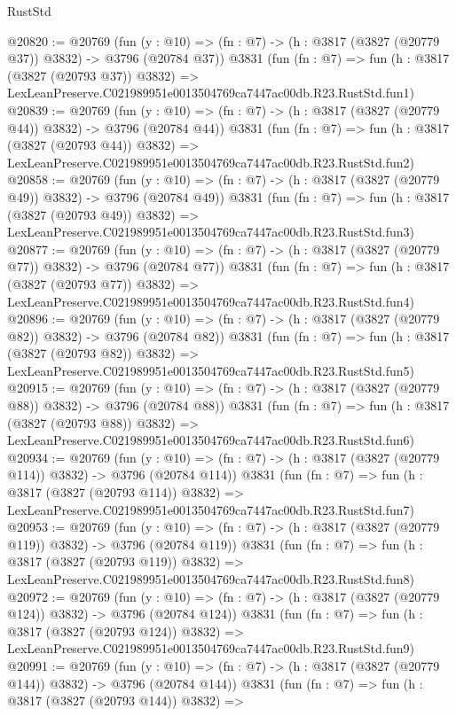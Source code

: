 \begin{lexlean}{RustStd}
\begin{coremodule}
@20820 := @20769
    (fun (y : @10) => (fn : @7) -> (h : @3817 (@3827 (@20779 @37)) @3832) -> @3796 (@20784 @37))
    @3831
    (fun (fn : @7) =>
    fun (h : @3817 (@3827 (@20793 @37)) @3832) =>
    LexLeanPreserve.C021989951e0013504769ca7447ac00db.R23.RustStd.fun1)
@20839 := @20769
    (fun (y : @10) => (fn : @7) -> (h : @3817 (@3827 (@20779 @44)) @3832) -> @3796 (@20784 @44))
    @3831
    (fun (fn : @7) =>
    fun (h : @3817 (@3827 (@20793 @44)) @3832) =>
    LexLeanPreserve.C021989951e0013504769ca7447ac00db.R23.RustStd.fun2)
@20858 := @20769
    (fun (y : @10) => (fn : @7) -> (h : @3817 (@3827 (@20779 @49)) @3832) -> @3796 (@20784 @49))
    @3831
    (fun (fn : @7) =>
    fun (h : @3817 (@3827 (@20793 @49)) @3832) =>
    LexLeanPreserve.C021989951e0013504769ca7447ac00db.R23.RustStd.fun3)
@20877 := @20769
    (fun (y : @10) => (fn : @7) -> (h : @3817 (@3827 (@20779 @77)) @3832) -> @3796 (@20784 @77))
    @3831
    (fun (fn : @7) =>
    fun (h : @3817 (@3827 (@20793 @77)) @3832) =>
    LexLeanPreserve.C021989951e0013504769ca7447ac00db.R23.RustStd.fun4)
@20896 := @20769
    (fun (y : @10) => (fn : @7) -> (h : @3817 (@3827 (@20779 @82)) @3832) -> @3796 (@20784 @82))
    @3831
    (fun (fn : @7) =>
    fun (h : @3817 (@3827 (@20793 @82)) @3832) =>
    LexLeanPreserve.C021989951e0013504769ca7447ac00db.R23.RustStd.fun5)
@20915 := @20769
    (fun (y : @10) => (fn : @7) -> (h : @3817 (@3827 (@20779 @88)) @3832) -> @3796 (@20784 @88))
    @3831
    (fun (fn : @7) =>
    fun (h : @3817 (@3827 (@20793 @88)) @3832) =>
    LexLeanPreserve.C021989951e0013504769ca7447ac00db.R23.RustStd.fun6)
@20934 := @20769
    (fun (y : @10) => (fn : @7) -> (h : @3817 (@3827 (@20779 @114)) @3832) -> @3796 (@20784 @114))
    @3831
    (fun (fn : @7) =>
    fun (h : @3817 (@3827 (@20793 @114)) @3832) =>
    LexLeanPreserve.C021989951e0013504769ca7447ac00db.R23.RustStd.fun7)
@20953 := @20769
    (fun (y : @10) => (fn : @7) -> (h : @3817 (@3827 (@20779 @119)) @3832) -> @3796 (@20784 @119))
    @3831
    (fun (fn : @7) =>
    fun (h : @3817 (@3827 (@20793 @119)) @3832) =>
    LexLeanPreserve.C021989951e0013504769ca7447ac00db.R23.RustStd.fun8)
@20972 := @20769
    (fun (y : @10) => (fn : @7) -> (h : @3817 (@3827 (@20779 @124)) @3832) -> @3796 (@20784 @124))
    @3831
    (fun (fn : @7) =>
    fun (h : @3817 (@3827 (@20793 @124)) @3832) =>
    LexLeanPreserve.C021989951e0013504769ca7447ac00db.R23.RustStd.fun9)
@20991 := @20769
    (fun (y : @10) => (fn : @7) -> (h : @3817 (@3827 (@20779 @144)) @3832) -> @3796 (@20784 @144))
    @3831
    (fun (fn : @7) =>
    fun (h : @3817 (@3827 (@20793 @144)) @3832) =>

\end{coremodule}
\end{lexlean}

